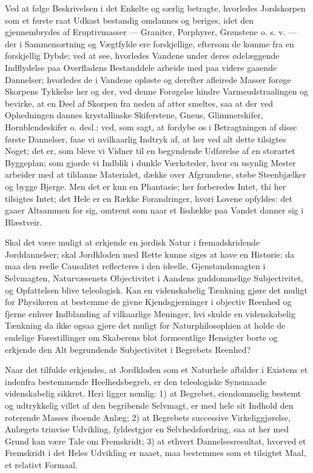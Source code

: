 \documentclass[12pt,a4paper]{book}
\begin{document}
Ved at følge Beskrivelsen i det Enkelte og særlig betragte, hvorledes
Jordskorpen som et første raat Udkast bestandig omdannes og beriges, idet den
gjennembrydes af Eruptivmasser --- Graniter, Porphyrer, Grønstene o. s. v. ---
der i Sammensætning og Vægtfylde ere forskjellige, eftersom de komme fra en
forskjellig Dybde; ved at see, hvorledes Vandene under deres ødelæggende
Indflydelse paa Overfladens Bestanddele arbeide med paa videre gaaende
Dannelser; hvorledes de i Vandene opløste og derefter afleirede Masser forøge
Skorpens Tykkelse her og der, ved denne Forøgelse hindre Varmeudstraalingen og
bevirke, at en Deel af Skorpen fra neden af atter smeltes, saa at der ved
Ophedningen dannes krystallinske Skiferstene, Gneus, Glimmerskifer,
Hornblendeskifer o. desl.; ved, som sagt, at fordybe os i Betragtningen af
disse første Dannelser, faae vi uvilkaarlig Indtryk af, at her ved alt dette
tilsigtes Noget; det er, som
bleve vi Vidner til en begyndende Udførelse af en storartet Byggeplan; som
gjorde vi Indblik i dunkle Værksteder, hvor en usynlig Mester arbeider med at
tildanne Materialet, dække over Afgrundene, støbe Steenbjælker og bygge
Bjerge. Men det er kun en Phantasie; her forberedes Intet, thi her tilsigtes
Intet; det Hele er en Række Forandringer, hvori Lovene opfyldes: det gaaer
Altsammen for sig, omtrent som naar et Iisdække paa Vandet danner sig i
Blæstveir.

Skal det være muligt at erkjende en jordisk Natur i fremadskridende
Jorddannelser; skal Jordkloden med Rette kunne siges at have en Historie: da
maa den reelle Causalitet reflecteres i den ideelle, Gjenstandsmagten i
Selvmagten, Naturvæsenets Objectivitet i Aandens guddommelige Subjectivitet,
og Opfattelsen blive teleologisk. Kan en videnskabelig Tænkning gjøre det
muligt for Physikeren at bestemme de givne Kjendsgjerninger i objectiv Reenhed
og fjerne enhver Indblanding af vilkaarlige Meninger, hvi skulde en
videnskabelig Tænkning da ikke ogsaa gjøre det muligt for Naturphilosophien at
holde de endelige Forestillinger om Skaberens blot formeentlige Hensigter
borte og erkjende den Alt begrundende Subjectivitet i Begrebets Reenhed?

Naar det tilfulde erkjendes, at Jordkloden som et Naturhele afbilder i
Existens et indenfra bestemmende Heelhedsbegreb, er den teleologiske
Synsmaade videnskabelig sikkret. Heri ligger nemlig: 1) at Begrebet,
eiendommelig bestemt og udtrykkelig villet af den begribende Selvmagt, er med
hele sit Indhold den roterende Masses iboende Anlæg; 2) at Begrebets
successive Virkeliggjørelse, Anlægets trinvise Udvikling, fyldestgjør en
Selvhedsfordring, saa at her med Grund kan være Tale om Fremskridt; 3) at
ethvert Dannelsesresultat, hvorved et Fremskridt i det Heles Udvikling er
naaet, maa bestemmes som et tilsigtet Maal, et relativt Formaal.
\end{document}
